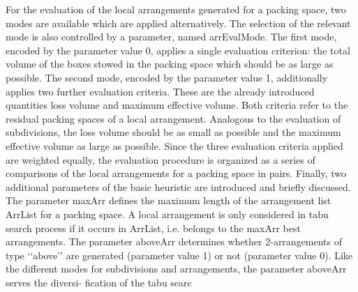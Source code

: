 

For the evaluation of the local arrangements generated for a packing space, two
modes are available which are applied alternatively. The selection of the relevant
mode is also controlled by a parameter, named arrEvalMode.
The first mode, encoded by the parameter value 0, applies a single evaluation criterion:
the total volume of the boxes stowed in the packing space which should be as
large as possible.
The second mode, encoded by the parameter value 1, additionally applies two further
evaluation criteria. These are the already introduced quantities loss volume and
maximum effective volume. Both criteria refer to the residual packing spaces of a local
arrangement. Analogous to the evaluation of subdivisions, the loss volume
should be as small as possible and the maximum effective volume as large as possible.
Since the three evaluation criteria applied are weighted equally, the evaluation procedure
is organized as a series of comparisons of the local arrangements for a packing
space in pairs.
Finally, two additional parameters of the basic heuristic are introduced and
briefly discussed. The parameter maxArr defines the maximum length of the arrangement
list ArrList for a packing space. A local arrangement is only considered in tabu search process if it occurs in ArrList, i.e. belongs to the maxArr best arrangements.
The parameter aboveArr determines whether 2-arrangements of type ‘‘above’’
are generated (parameter value 1) or not (parameter value 0). Like the different
modes for subdivisions and arrangements, the parameter aboveArr serves the diversi-
fication of the tabu searc




